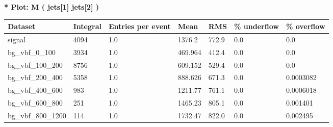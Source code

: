 \documentclass[a4paper, 10pt]{article}
\begin{document}
\textbf{* Plot: M ( jets[1] jets[2] ) }\\
   \begin{table}[H]
  \begin{center}
    \begin{tabular}{|m{23.0mm}|m{23.0mm}|m{18.0mm}|m{19.0mm}|m{19.0mm}|m{19.0mm}|m{19.0mm}|}
      \hline
      {\cellcolor{yellow}         Dataset}& {\cellcolor{yellow}         Integral}& {\cellcolor{yellow}         Entries per event}& {\cellcolor{yellow}         Mean}& {\cellcolor{yellow}         RMS}& {\cellcolor{yellow}         \% underflow}& {\cellcolor{yellow}         \% overflow}\\
      \hline
      {\cellcolor{white}         signal}& {\cellcolor{white}         4094}& {\cellcolor{white}         1.0}& {\cellcolor{white}         1376.2}& {\cellcolor{white}         772.9}& {\cellcolor{green}         0.0}& {\cellcolor{green}         0.0}\\
      \hline
      {\cellcolor{white}         bg\_vbf\_0\_100}& {\cellcolor{white}         3934}& {\cellcolor{white}         1.0}& {\cellcolor{white}         469.964}& {\cellcolor{white}         412.4}& {\cellcolor{green}         0.0}& {\cellcolor{green}         0.0}\\
      \hline
      {\cellcolor{white}         bg\_vbf\_100\_200}& {\cellcolor{white}         8756}& {\cellcolor{white}         1.0}& {\cellcolor{white}         609.152}& {\cellcolor{white}         529.4}& {\cellcolor{green}         0.0}& {\cellcolor{green}         0.0}\\
      \hline
      {\cellcolor{white}         bg\_vbf\_200\_400}& {\cellcolor{white}         5358}& {\cellcolor{white}         1.0}& {\cellcolor{white}         888.626}& {\cellcolor{white}         671.3}& {\cellcolor{green}         0.0}& {\cellcolor{green}         0.0003082}\\
      \hline
      {\cellcolor{white}         bg\_vbf\_400\_600}& {\cellcolor{white}         983}& {\cellcolor{white}         1.0}& {\cellcolor{white}         1211.77}& {\cellcolor{white}         761.1}& {\cellcolor{green}         0.0}& {\cellcolor{green}         0.0006018}\\
      \hline
      {\cellcolor{white}         bg\_vbf\_600\_800}& {\cellcolor{white}         251}& {\cellcolor{white}         1.0}& {\cellcolor{white}         1465.23}& {\cellcolor{white}         805.1}& {\cellcolor{green}         0.0}& {\cellcolor{green}         0.001401}\\
      \hline
      {\cellcolor{white}         bg\_vbf\_800\_1200}& {\cellcolor{white}         114}& {\cellcolor{white}         1.0}& {\cellcolor{white}         1732.47}& {\cellcolor{white}         822.0}& {\cellcolor{green}         0.0}& {\cellcolor{green}         0.002495}\\

\end{tabular}
\end{center}
\end{table}
\end{document}

